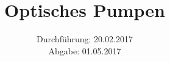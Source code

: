 

\subject{Versuch 21}
\title{Optisches Pumpen}
\date{Durchführung: 20.02.2017 \\
      Abgabe: 01.05.2017}



\maketitle
\newpage







\printbibliography


